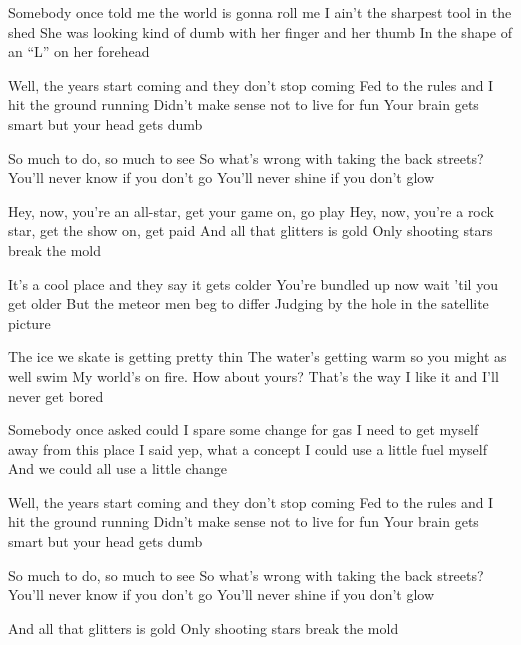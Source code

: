 \begin{verse*}
Somebody once told me the world is gonna roll me
I ain't the sharpest tool in the shed
She was looking kind of dumb with her finger and her thumb
In the shape of an ``L'' on her forehead
\end{verse*}

\begin{verse*}
Well, the years start coming and they don't stop coming
Fed to the rules and I hit the ground running
Didn't make sense not to live for fun
Your brain gets smart but your head gets dumb
\end{verse*}

\begin{verse*}
So much to do, so much to see
So what's wrong with taking the back streets?
You'll never know if you don't go
You'll never shine if you don't glow
\end{verse*}

\begin{chorus}
Hey, now, you're an all-star, get your game on, go play
Hey, now, you're a rock star, get the show on, get paid
And all that glitters is gold
Only shooting stars break the mold
\end{chorus}

\begin{verse*}
It's a cool place and they say it gets colder
You're bundled up now wait 'til you get older
But the meteor men beg to differ
Judging by the hole in the satellite picture
\end{verse*}

\begin{verse*}
The ice we skate is getting pretty thin
The water's getting warm so you might as well swim
My world's on fire. How about yours?
That's the way I like it and I'll never get bored
\end{verse*}

\thechorus[2]

\begin{verse*}
Somebody once asked could I spare some change for gas
I need to get myself away from this place
I said yep, what a concept
I could use a little fuel myself
And we could all use a little change
\end{verse*}

\begin{verse*}
Well, the years start coming and they don't stop coming
Fed to the rules and I hit the ground running
Didn't make sense not to live for fun
Your brain gets smart but your head gets dumb
\end{verse*}

\begin{verse*}
So much to do, so much to see
So what's wrong with taking the back streets?
You'll never know if you don't go
You'll never shine if you don't glow
\end{verse*}

\thechorus

\begin{verse*}
And all that glitters is gold
Only shooting stars break the mold
\end{verse*}
